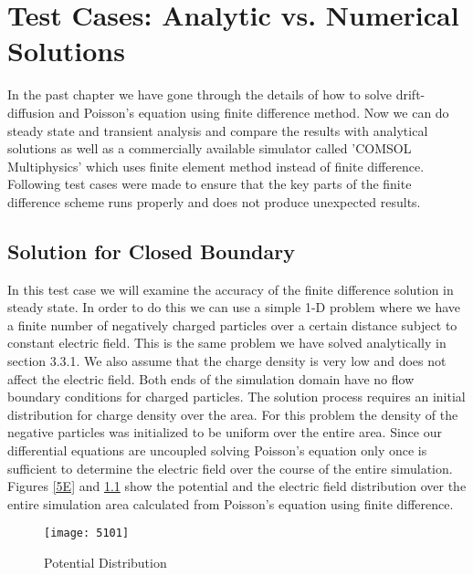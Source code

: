 
\chapter{Test Cases: Analytic vs. Numerical Solutions} %

\label{Chapter4} %


In the past chapter we have gone through the details of how to solve drift-diffusion and Poisson's equation using finite difference method. Now we can do steady state and transient analysis and compare the results with analytical solutions as well as a commercially available simulator called 'COMSOL Multiphysics' which uses finite element method instead of finite difference. Following test cases were made to ensure that the key parts of the finite difference scheme runs properly and does not produce unexpected results. 

\section{Solution for Closed Boundary}
In this test case we will examine the accuracy of the finite difference solution in steady state. In order to do this we can use a simple 1-D problem where we have a finite number of negatively charged particles over a certain distance subject to constant electric field. This is the same problem we have solved analytically in section 3.3.1. We also assume that the charge density is very low and does not affect the electric field. Both ends of the simulation domain have no flow boundary conditions for charged particles. The solution process requires an initial distribution for charge density over the area. For this problem the density of the negative particles was initialized to be uniform over the entire area. Since our differential equations are uncoupled solving Poisson's equation only once is sufficient to determine the electric field over the course of the entire simulation. Figures \ref{5E} and \ref{5pot} show the potential and the electric field distribution over the entire simulation area calculated from Poisson's equation using finite difference. 

\begin{figure}
\centering
\texttt{[image: 5101]}
\caption{Potential Distribution} 
\label{5pot}
\end{figure}

